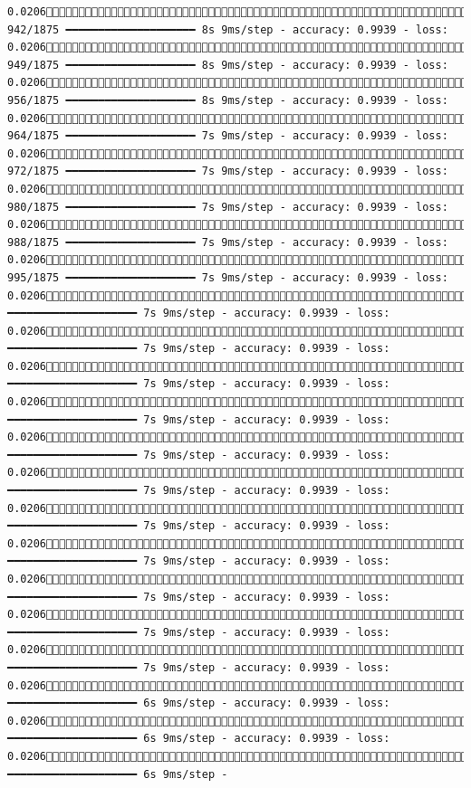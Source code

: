 \documentclass[
  letterpaper,
  DIV=11,
  numbers=noendperiod]{scrreprt}
\begin{document}
\begin{verbatim}
0.0206 942/1875 ━━━━━━━━━━━━━━━━━━━━ 8s 9ms/step - accuracy: 0.9939 - loss: 0.0206 949/1875 ━━━━━━━━━━━━━━━━━━━━ 8s 9ms/step - accuracy: 0.9939 - loss: 0.0206 956/1875 ━━━━━━━━━━━━━━━━━━━━ 8s 9ms/step - accuracy: 0.9939 - loss: 0.0206 964/1875 ━━━━━━━━━━━━━━━━━━━━ 7s 9ms/step - accuracy: 0.9939 - loss: 0.0206 972/1875 ━━━━━━━━━━━━━━━━━━━━ 7s 9ms/step - accuracy: 0.9939 - loss: 0.0206 980/1875 ━━━━━━━━━━━━━━━━━━━━ 7s 9ms/step - accuracy: 0.9939 - loss: 0.0206 988/1875 ━━━━━━━━━━━━━━━━━━━━ 7s 9ms/step - accuracy: 0.9939 - loss: 0.0206 995/1875 ━━━━━━━━━━━━━━━━━━━━ 7s 9ms/step - accuracy: 0.9939 - loss: 0.02061002/1875 ━━━━━━━━━━━━━━━━━━━━ 7s 9ms/step - accuracy: 0.9939 - loss: 0.02061009/1875 ━━━━━━━━━━━━━━━━━━━━ 7s 9ms/step - accuracy: 0.9939 - loss: 0.02061016/1875 ━━━━━━━━━━━━━━━━━━━━ 7s 9ms/step - accuracy: 0.9939 - loss: 0.02061024/1875 ━━━━━━━━━━━━━━━━━━━━ 7s 9ms/step - accuracy: 0.9939 - loss: 0.02061031/1875 ━━━━━━━━━━━━━━━━━━━━ 7s 9ms/step - accuracy: 0.9939 - loss: 0.02061039/1875 ━━━━━━━━━━━━━━━━━━━━ 7s 9ms/step - accuracy: 0.9939 - loss: 0.02061045/1875 ━━━━━━━━━━━━━━━━━━━━ 7s 9ms/step - accuracy: 0.9939 - loss: 0.02061051/1875 ━━━━━━━━━━━━━━━━━━━━ 7s 9ms/step - accuracy: 0.9939 - loss: 0.02061056/1875 ━━━━━━━━━━━━━━━━━━━━ 7s 9ms/step - accuracy: 0.9939 - loss: 0.02061062/1875 ━━━━━━━━━━━━━━━━━━━━ 7s 9ms/step - accuracy: 0.9939 - loss: 0.02061068/1875 ━━━━━━━━━━━━━━━━━━━━ 7s 9ms/step - accuracy: 0.9939 - loss: 0.02061074/1875 ━━━━━━━━━━━━━━━━━━━━ 6s 9ms/step - accuracy: 0.9939 - loss: 0.02061080/1875 ━━━━━━━━━━━━━━━━━━━━ 6s 9ms/step - accuracy: 0.9939 - loss: 0.02061086/1875 ━━━━━━━━━━━━━━━━━━━━ 6s 9ms/step - 
\end{verbatim}
\end{document}
